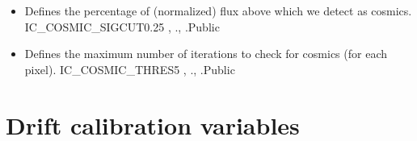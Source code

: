 \begin{itemize}
\item {} 
{Defines the percentage of (normalized) flux above which we detect as cosmics.}
{IC\_COSMIC\_SIGCUT}{0.25}
{\calFFraw, \calextractRAW}{\constantsfile}{\spirouEXTOR., \spirouEXTOR.}{Public}

\item {} 
{Defines the maximum number of iterations to check for cosmics (for each pixel).}
{IC\_COSMIC\_THRES}{5}
{\calFFraw, \calextractRAW}{\constantsfile}{\spirouEXTOR., \spirouEXTOR.}{Public}

\end{itemize}







\clearpage
\newpage
\section{Drift calibration variables}
\label{ch:variables:drift}

